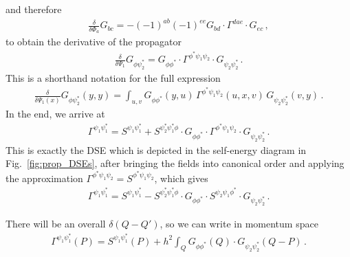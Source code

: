and therefore~\cite{Pawlowski2021} 
\begin{align}
	\frac{\delta}{\delta\Phi_a} G_{b c}
	= - (-1)^{ab} (-1)^{ee} G_{bd} \cdot \Gamma^{dae} \cdot G_{ec} \,,
\end{align}
to obtain the derivative of the propagator
\begin{align}
	\frac{\delta}{\delta\Psi_1}	G_{\phi \psi^*_2}
	= G_{\phi\phi^*} \cdot \Gamma^{\phi^*\psi_1\psi_2}
	\cdot G_{\psi_2\psi_2^*} \,.
\end{align}
This is a shorthand notation for the full expression
\begin{align}
	\frac{\delta}{\delta\Psi_1(x)}
	G_{\phi \psi_2^*}(y,y)
	= \int_{u,v} G_{\phi\phi^*}(y,u) \,
	\Gamma^{\phi^*\psi_1 \psi_2}(u,x,v) \,
	G_{\psi_2 \psi_2^*}(v,y) \,.
\end{align}
In the end, we arrive at
\begin{align}
	\Gamma^{\psi_1\psi^*_1} = S^{\psi_1\psi^*_1}
	+ S^{\psi^*_2\psi^*_1\phi} \cdot G_{\phi\phi^*}
	\cdot \Gamma^{\phi^*\psi_1\psi_2}
	\cdot G_{\psi_2\psi_2^*}  \,.
\end{align}
This is exactly the DSE which is depicted in the self-energy diagram in Fig.~\ref{fig:prop_DSEs}, after bringing the fields into canonical order and applying the approximation $\Gamma^{\phi^*\psi_1\psi_2} = S^{\phi^*\psi_1\psi_2}$, which gives
\begin{align}
	\Gamma^{\psi_1\psi^*_1} = S^{\psi_1\psi^*_1}
	- S^{\psi^*_2\psi^*_1\phi} \cdot G_{\phi\phi^*}
	\cdot S^{\psi_2\psi_1\phi^*}
	\cdot G_{\psi_2\psi_2^*}  \,.
\end{align}

There will be an overall $\delta(Q-Q')$, so we can write in momentum space
\begin{align}
	\Gamma^{\psi_1\psi^*_1}(P) = S^{\psi_1\psi^*_1}(P)
	+ h^2 \int_Q G_{\phi\phi^*}(Q)
	\cdot G_{\psi_2\psi_2^*}(Q-P)  \,.
\end{align}

\clearpage

